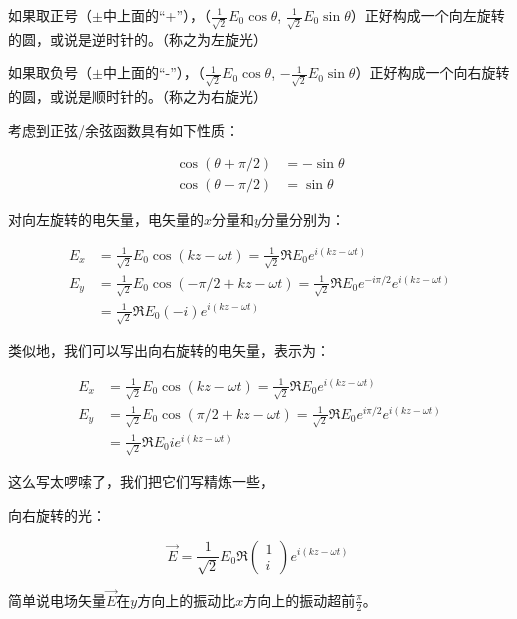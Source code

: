 \begin{enumerate}
如果取正号（$\pm$中上面的“+”），（$ \frac{1}{\sqrt{2}} E_0 \cos \theta$, $ \frac{1}{\sqrt{2}} E_0 \sin \theta$）正好构成一个向左旋转的圆，或说是逆时针的。（称之为左旋光）

如果取负号（$\pm$中上面的“-”），（$ \frac{1}{\sqrt{2}} E_0 \cos \theta$, $ - \frac{1}{\sqrt{2}} E_0 \sin \theta$）正好构成一个向右旋转的圆，或说是顺时针的。（称之为右旋光）

考虑到正弦/余弦函数具有如下性质：

\begin{align}
\cos (\theta + \pi /2 ) &= - \sin \theta \\
\cos (\theta -  \pi /2 ) &= \sin \theta~
\end{align}

对向左旋转的电矢量，电矢量的$x$分量和$y$分量分别为：

\begin{align}
E_x &= \frac{1}{\sqrt{2}}  E_0 \cos (k z - \omega t) = \frac{1}{\sqrt{2}}  \Re E_0 e^{i (k z - \omega t)}  \\
E_y &= \frac{1}{\sqrt{2}}  E_0 \cos ( - \pi /2 +  kz - \omega t  ) = \frac{1}{\sqrt{2}}  \Re E_0 e^{ - i \pi /2 } e^{i (kz - \omega t)} \\
{} &= \frac{1}{\sqrt{2}}  \Re E_0 (-i) e^{i (kz - \omega t)}~
\end{align}

类似地，我们可以写出向右旋转的电矢量，表示为：

\begin{align}
E_x &= \frac{1}{\sqrt{2}}  E_0 \cos (k z - \omega t) = \frac{1}{\sqrt{2}}  \Re E_0 e^{i (k z - \omega t)}  \\
E_y &= \frac{1}{\sqrt{2}}  E_0 \cos ( \pi /2 +  kz - \omega t  ) = \frac{1}{\sqrt{2}}  \Re E_0 e^{ i \pi /2 } e^{i (kz - \omega t)} \\
{} & =  \frac{1}{\sqrt{2}}  \Re E_0 i e^{i (kz - \omega t)} ~
\end{align}

这么写太啰嗦了，我们把它们写精炼一些，

向右旋转的光：

\begin{equation}
\vec E = \frac{1}{\sqrt{2}} E_0 \Re \left(
\begin{array}{c}
1 \\  i
\end{array}
\right) e^{i (kz - \omega t)}~
\end{equation}

简单说电场矢量$\vec E$在$y$方向上的振动比$x$方向上的振动超前$\frac{\pi}{2}$。


\end{enumerate}

